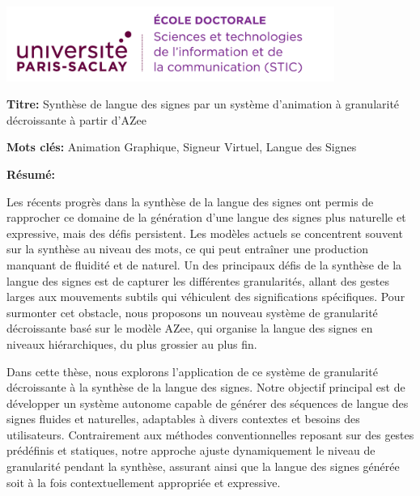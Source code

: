 \documentclass[english,12pt,a4paper]{book}
\begin{document}
\lhead{}
\rhead{}
\rfoot{}
\cfoot{}
\lfoot{}

\noindent 
\includegraphics[height=2.45cm]{logo_ups_STIC.png}
\vspace{1cm}
\selectfont

\small

\begin{mdframed}[linecolor=Prune,linewidth=1]

\textbf{Titre:} Synthèse de langue des signes par un système d'animation à granularité décroissante à partir d'AZee

\noindent \textbf{Mots clés:} Animation Graphique, Signeur Virtuel, Langue des Signes

\vspace{-.5cm}
\begin{multicols}{2}
\noindent \textbf{Résumé:}

Les récents progrès dans la synthèse de la langue des signes ont permis de rapprocher ce domaine de la génération d'une langue des signes plus naturelle et expressive, mais des défis persistent. Les modèles actuels se concentrent souvent sur la synthèse au niveau des mots, ce qui peut entraîner une production manquant de fluidité et de naturel. Un des principaux défis de la synthèse de la langue des signes est de capturer les différentes granularités, allant des gestes larges aux mouvements subtils qui véhiculent des significations spécifiques. Pour surmonter cet obstacle, nous proposons un nouveau système de granularité décroissante basé sur le modèle AZee, qui organise la langue des signes en niveaux hiérarchiques, du plus grossier au plus fin.

Dans cette thèse, nous explorons l'application de ce système de granularité décroissante à la synthèse de la langue des signes. Notre objectif principal est de développer un système autonome capable de générer des séquences de langue des signes fluides et naturelles, adaptables à divers contextes et besoins des utilisateurs. Contrairement aux méthodes conventionnelles reposant sur des gestes prédéfinis et statiques, notre approche ajuste dynamiquement le niveau de granularité pendant la synthèse, assurant ainsi que la langue des signes générée soit à la fois contextuellement appropriée et expressive.


\end{multicols}
\end{mdframed}
\end{document}
